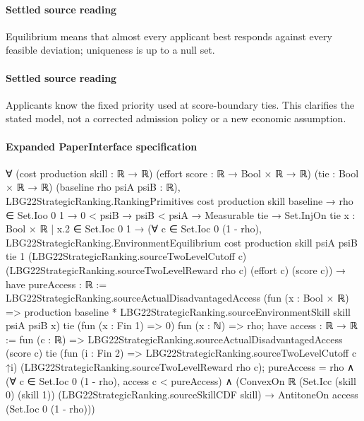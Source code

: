 \documentclass[10pt]{article}
\begin{document}
\paragraph{Settled source reading}
\begin{sloppypar}
Equilibrium means that almost every applicant best responds against every feasible deviation;\allowbreak{} uniqueness is up to a null set.\allowbreak{}
\end{sloppypar}
\paragraph{Settled source reading}
\begin{sloppypar}
Applicants know the fixed priority used at score-\allowbreak{}boundary ties.\allowbreak{} This clarifies the stated model, not a corrected admission policy or a new economic assumption.\allowbreak{}
\end{sloppypar}

\paragraph{Expanded PaperInterface specification}
\begin{ReviewVerbatim}
∀ (cost production skill : ℝ → ℝ) (effort score : ℝ → Bool × ℝ → ℝ) (tie : Bool × ℝ → ℝ) (baseline rho psiA psiB : ℝ),
  LBG22StrategicRanking.RankingPrimitives cost production skill baseline →
    rho ∈ Set.Ioo 0 1 →
      0 < psiB →
        psiB < psiA →
          Measurable tie →
            Set.InjOn tie {x : Bool × ℝ | x.2 ∈ Set.Ioc 0 1} →
              (∀ c ∈ Set.Ioc 0 (1 - rho),
                  LBG22StrategicRanking.EnvironmentEquilibrium cost production skill psiA psiB tie 1
                    (LBG22StrategicRanking.sourceTwoLevelCutoff c) (LBG22StrategicRanking.sourceTwoLevelReward rho c)
                    (effort c) (score c)) →
                have pureAccess : ℝ :=
                  LBG22StrategicRanking.sourceActualDisadvantagedAccess
                    (fun (x : Bool × ℝ) =>
                      production baseline * LBG22StrategicRanking.sourceEnvironmentSkill skill psiA psiB x)
                    tie (fun (x : Fin 1) => 0) fun (x : ℕ) => rho;
                have access : ℝ → ℝ := fun (c : ℝ) =>
                  LBG22StrategicRanking.sourceActualDisadvantagedAccess (score c) tie
                    (fun (i : Fin 2) => LBG22StrategicRanking.sourceTwoLevelCutoff c ↑i)
                    (LBG22StrategicRanking.sourceTwoLevelReward rho c);
                pureAccess = rho ∧
                  (∀ c ∈ Set.Ioc 0 (1 - rho), access c < pureAccess) ∧
                    (ConvexOn ℝ (Set.Icc (skill 0) (skill 1)) (LBG22StrategicRanking.sourceSkillCDF skill) →
                      AntitoneOn access (Set.Ioc 0 (1 - rho)))
\end{ReviewVerbatim}
\end{document}
